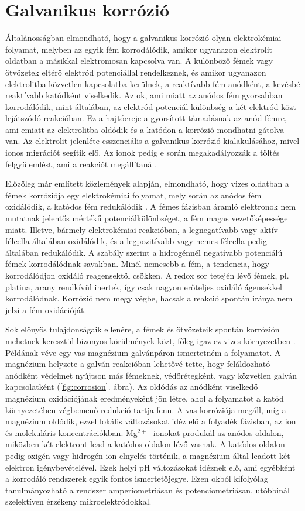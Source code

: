 \section{Galvanikus korrózió}

Általánosságban elmondható, hogy a galvanikus korrózió olyan elektrokémiai folyamat, melyben az egyik fém korrodálódik, amikor ugyanazon elektrolit oldatban a másikkal elektromosan kapcsolva van. A különböző fémek vagy ötvözetek eltérő elektród potenciállal rendelkeznek, és amikor ugyanazon elektrolitba közvetlen kapcsolatba kerülnek, a reaktívabb fém anódként, a kevésbé reaktívabb katódként viselkedik. Az ok, ami miatt az anódos fém gyorsabban korrodálódik, mint általában, az elektród potenciál különbség a két elektród közt lejátszódó reakcióban. Ez a hajtóereje a gyorsított támadásnak az anód fémre, ami emiatt az elektrolitba oldódik és a katódon a korrózió mondhatni gátolva van. Az elektrolit jelenléte esszenciális a galvanikus korrózió kialakulásához, mivel ionos migrációt segítik elő. Az ionok pedig e során megakadályozzák a töltés felgyülemlést, ami a reakciót megállítaná \cite{fontana2018corrosion}. 

Előzőleg már említett közlemények alapján, elmondható, hogy vizes oldatban a fémek korróziója egy elektrokémiai folyamat, mely során az anódos fém oxidálódik, a katódos fém redukálódik \cite{isaacs1981scanning}. A fémes fázisban áramló elektronok nem mutatnak jelentős mértékű potenciálkülönbséget, a fém magas vezetőképessége miatt. Illetve, bármely elektrokémiai reakcióban, a legnegatívabb vagy aktív félcella általában oxidálódik, és a legpozitívabb vagy nemes félcella pedig általában redukálódik. A szabály szerint a hidrogénnél negatívabb potenciálú fémek korrodálódnak savakban. Minél nemesebb a fém, a tendencia, hogy korrodálódjon oxidáló reagensektől csökken. A redox sor tetején lévő fémek, pl. platina, arany rendkívül inertek, így csak nagyon erőteljes oxidáló ágensekkel korrodálódnak. Korrózió nem megy végbe, hacsak a reakció spontán iránya nem jelzi a fém oxidációját.

Sok előnyös tulajdonságaik ellenére, a fémek és ötvözeteik spontán korrózión mehetnek keresztül bizonyos körülmények közt, főleg igaz ez vizes környezetben \cite{izquierdo2013potentiometric}. Példának véve egy vas-magnézium galvánpáron ismertetném a folyamatot. A magnézium helyzete a galván reakcióban lehetővé tette, hogy feláldozható anódként védelmet nyújtson más fémeknek, védőrétegként, vagy közvetlen galván kapcsolatként (\ref{fig:corrosion}. ábra). Az oldódás az anódként viselkedő magnézium oxidációjának eredményeként jön létre, ahol a folyamatot a katód környezetében végbemenő redukció tartja fenn. A vas korróziója megáll, míg a magnézium oldódik, ezzel lokális változásokat idéz elő a folyadék fázisban, az ion és molekuláris koncentrációkban. Mg$^{2+}$- ionokat produkál az anódos oldalon, miközben két elektront lead a katódos oldalon lévő vasnak. A katódos oldalon pedig oxigén vagy hidrogén-ion elnyelés történik, a magnézium által leadott két elektron igénybevételével. Ezek helyi pH változásokat idéznek elő, ami egyébként a korrodáló rendszerek egyik fontos ismertetőjegye.  Ezen okból kifolyólag tanulmányozható a rendszer amperiometriásan és potenciometriásan, utóbbinál szelektíven érzékeny mikroelektródokkal.

